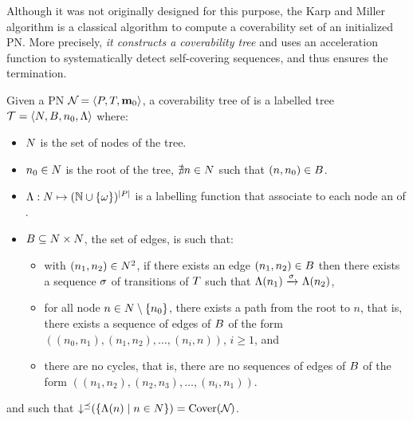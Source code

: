 Although it was not originally designed for this purpose, the Karp and Miller algorithm \cite{Karp69} is a classical algorithm to compute a coverability set of an initialized \ac{PN}.
More precisely, \emph{it constructs a coverability tree} and uses an acceleration function to systematically detect self-covering sequences, and thus ensures the termination.

\begin{defi}
  Given a \ac{PN} $\defPN$, a coverability tree \nameT of \namePN is a labelled tree $\mathcal{T} = \left\langle N, B, n_0, \operatorname{\Lambda}\right\rangle$ where:
  \begin{itemize}
    \item $N$ is the set of nodes of the tree.%

    \item $n_0 \in N$ is the root of the tree,  $\nexists n \in N$ such that $(n, n_0) \in B$.

    \item $\operatorname{\Lambda} : N \mapsto (\mathbb{N} \cup \{\omega\})^{\left|P\right|}$ is a labelling function that associate to each node an \omark of \namePN.

    \item $B \subseteq N \times N$, the set of edges, is such that:
      \begin{itemize}
        \item with $(n_1, n_2) \in N^2$, if there exists an edge $(n_1, n_2) \in B$ then there exists a sequence $\seqt$ of transitions of $T$ such that $\lab{n_1} \fire{\seqt} \lab{n_2}$,
        \item for all node $n \in N \setminus \{n_0\}$, there exists a path from the root to $n$, that is, there exists a sequence of edges of $B$ of the form $((n_0, n_1), (n_1, n_2), \dots, (n_{i}, n))$, $i \geq 1$, and
        \item there are no cycles, that is, there are no sequences of edges of $B$ of the form $((n_1, n_2), (n_2, n_3), \dots, (n_i, n_1))$.
      \end{itemize}
  \end{itemize}
  and such that $\operatorname{\downarrow^\preceq}(\left\{\operatorname{\Lambda}(n) \mid n \in N\right\}) = \operatorname{Cover}(\mathcal{N}_{})$.
\end{defi}

